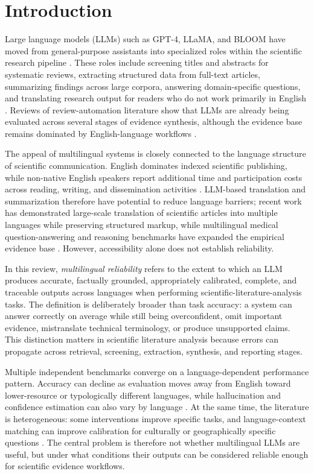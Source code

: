 \documentclass[acmsmall,nonacm]{acmart}
\begin{document}
\section{Introduction}\label{sec:introduction}
Large language models (LLMs) such as GPT-4, LLaMA, and BLOOM have moved from general-purpose assistants into specialized roles within the scientific research pipeline \cite{OpenAI2023,Touvron2023,BigScience2022}. These roles include screening titles and abstracts for systematic reviews, extracting structured data from full-text articles, summarizing findings across large corpora, answering domain-specific questions, and translating research output for readers who do not work primarily in English \cite{Scherbakov2025,Kleidermacher2025}. Reviews of review-automation literature show that LLMs are already being evaluated across several stages of evidence synthesis, although the evidence base remains dominated by English-language workflows \cite{Scherbakov2025}.

The appeal of multilingual systems is closely connected to the language structure of scientific communication. English dominates indexed scientific publishing, while non-native English speakers report additional time and participation costs across reading, writing, and dissemination activities \cite{Amano2023}. LLM-based translation and summarization therefore have potential to reduce language barriers; recent work has demonstrated large-scale translation of scientific articles into multiple languages while preserving structured markup, while multilingual medical question-answering and reasoning benchmarks have expanded the empirical evidence base \cite{Kleidermacher2025,GarcíaFerrero2024,Xuan2025}. However, accessibility alone does not establish reliability.

In this review, \emph{multilingual reliability} refers to the extent to which an LLM produces accurate, factually grounded, appropriately calibrated, complete, and traceable outputs across languages when performing scientific-literature-analysis tasks. The definition is deliberately broader than task accuracy: a system can answer correctly on average while still being overconfident, omit important evidence, mistranslate technical terminology, or produce unsupported claims. This distinction matters in scientific literature analysis because errors can propagate across retrieval, screening, extraction, synthesis, and reporting stages.

Multiple independent benchmarks converge on a language-dependent performance pattern. Accuracy can decline as evaluation moves away from English toward lower-resource or typologically different languages, while hallucination and confidence estimation can also vary by language \cite{Xuan2025,Xue2024,GarcíaFerrero2024,Huang2025}. At the same time, the literature is heterogeneous: some interventions improve specific tasks, and language-context matching can improve calibration for culturally or geographically specific questions \cite{Xue2024}. The central problem is therefore not whether multilingual LLMs are useful, but under what conditions their outputs can be considered reliable enough for scientific evidence workflows.
\end{document}
